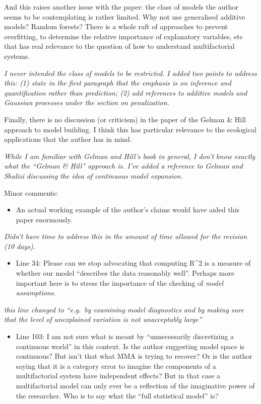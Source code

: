 \documentclass[12pt]{article}
\providecommand{\tightlist}{%
  \setlength{\itemsep}{0pt}\setlength{\parskip}{0pt}}
\begin{document}
And this raises another issue with the paper: the class of models the
author seems to be contemplating is rather limited. Why not use
generalised additive models? Random forests? There is a whole raft of
approaches to prevent overfitting, to determine the relative importance
of explanatory variables, etc that has real relevance to the question of
how to understand multifactorial systems.

\emph{I never intended the class of models to be restricted. I added two
points to address this: (1) state in the first paragraph that the
emphasis is on inference and quantification rather than prediction; (2)
add references to additive models and Gaussian processes under the
section on penalization.}

Finally, there is no discussion (or criticism) in the paper of the
Gelman \& Hill approach to model building. I think this has particular
relevance to the ecological applications that the author has in mind.

\emph{While I am familiar with Gelman and Hill's book in general, I
don't know exactly what the ``Gelman \& Hill'' approach is. I've added a
reference to Gelman and Shalizi discussing the idea of continuous model
expansion.}

Minor comments:

\begin{itemize}
\tightlist
\item
  An actual working example of the author's claims would have aided this
  paper enormously.
\end{itemize}

\emph{Didn't have time to address this in the amount of time allowed for
the revision (10 days).}

\begin{itemize}
\tightlist
\item
  Line 34: Please can we stop advocating that computing R\^{}2 is a
  measure of whether our model ``describes the data reasonably well''.
  Perhaps more important here is to stress the importance of the
  checking of \emph{model assumptions}.
\end{itemize}

\emph{this line changed to ``e.g.~by examining model diagnostics and by
making sure that the level of unexplained variation is not unacceptably
large''}

\begin{itemize}
\tightlist
\item
  Line 103: I am not sure what is meant by ``unnecessarily discretizing
  a continuous world'' in this context. Is the author suggesting model
  space is continuous? But isn't that what MMA is trying to recover? Or
  is the author saying that it is a category error to imagine the
  components of a multifactorial system have independent effects? But in
  that case a multifactorial model can only ever be a reflection of the
  imaginative power of the researcher. Who is to say what the ``full
  statistical model'' is?
\end{itemize}
\end{document}
